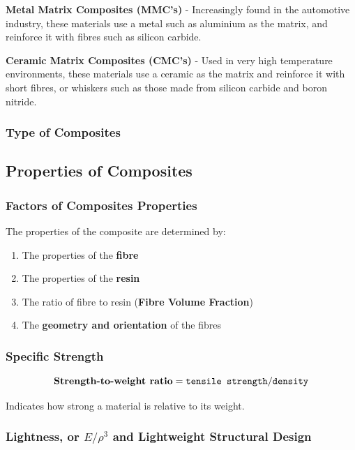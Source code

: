 \documentclass{NoteThesis/note-thesis}
\begin{document}
\textbf{Metal Matrix Composites (MMC's)} - Increasingly found in the automotive industry, these materials use a metal such as aluminium as the matrix, and reinforce it with fibres such as silicon carbide.

\textbf{Ceramic Matrix Composites (CMC's)} - Used in very high temperature environments, these materials use a ceramic as the matrix and reinforce it with short fibres, or whiskers such as those made from silicon carbide and boron nitride.

\subsubsection*{Type of Composites}


\subsection{Properties of Composites}

\subsubsection*{Factors of Composites Properties}

The properties of the composite are determined by:

\begin{enumerate}
    \item The properties of the \textbf{ fibre}
    \item The properties of the \textbf{resin}
    \item The ratio of fibre to resin (\textbf{Fibre Volume Fraction})
    \item The \textbf{geometry and orientation} of the fibres
\end{enumerate}

\subsubsection*{Specific Strength}

$$
\textbf{Strength-to-weight ratio} = \verb|tensile strength| / \verb|density|
$$

Indicates how strong a material is relative to its weight.

\subsubsection*{Lightness, or $E/\rho ^3$ and Lightweight Structural Design}
\end{document}
